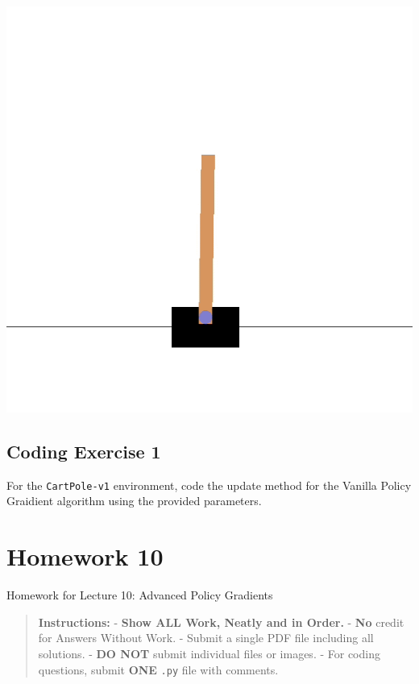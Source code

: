 \documentclass[
  letterpaper,
  DIV=11,
  numbers=noendperiod]{scrreprt}
\makeatletter
\newcommand*\pandocbounded[1]{%
  \sbox\pandoc@box{#1}%
  \Gscale@div\@tempa{\textheight}{\dimexpr\ht\pandoc@box+\dp\pandoc@box\relax}%
  \Gscale@div\@tempb{\linewidth}{\wd\pandoc@box}%
  \ifdim\@tempb\p@<\@tempa\p@\let\@tempa\@tempb\fi%
  \ifdim\@tempa\p@<\p@\scalebox{\@tempa}{\usebox\pandoc@box}%
  \else\usebox{\pandoc@box}%
  \fi%
}
\makeatother
\begin{document}
\begin{center}
\includegraphics[width=0.4\linewidth,height=\textheight,keepaspectratio]{homework/images/cartpole.gif}
\end{center}

\section{Coding Exercise 1}\label{coding-exercise-1-6}

For the \texttt{CartPole-v1} environment, code the update method for the
Vanilla Policy Graidient algorithm using the provided parameters.

\section{\texorpdfstring{\href{https://colab.research.google.com/drive/1Y_A4uKoSmjc6EmU-Or7tbeo3fe_ZD4RH?usp=sharing}{\protect\pandocbounded{}}}{}}\label{section-7}

\chapter{Homework 10}\label{homework-10}

\begin{tcolorbox}[enhanced jigsaw, arc=.35mm, toprule=.15mm, leftrule=.75mm, colback=white, left=2mm, colframe=quarto-callout-note-color-frame, rightrule=.15mm, opacityback=0, breakable, bottomrule=.15mm]

Homework for Lecture 10: Advanced Policy Gradients 📝

\end{tcolorbox}

\begin{quote}
\textbf{Instructions:} - \textbf{Show ALL Work, Neatly and in Order.} -
\textbf{No} credit for Answers Without Work. - Submit a single PDF file
including all solutions. - \textbf{DO NOT} submit individual files or
images. - For coding questions, submit \textbf{ONE} \texttt{.py} file
with comments.
\end{quote}
\end{document}
